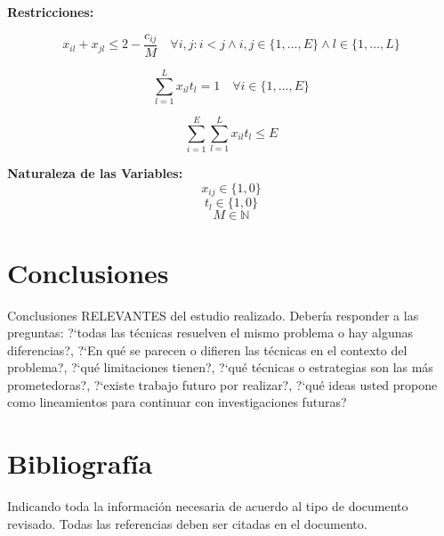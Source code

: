 \documentclass[letter, 10pt]{article}
\begin{document}
\textbf{Restricciones:}

\begin{equation} 
	x_{il} + x_{jl} \leq 2 - \frac{c_{ij}}{M} \quad \forall i, j : i<j \wedge i, j \in \{1, \ldots, E\} \wedge l \in \{1, \ldots, L\}
\end{equation}

\begin{equation}
	\sum_{l=1}^{L} x_{il}t_l = 1 \quad \forall i \in \{1, \ldots, E\}
\end{equation}

\begin{equation}
	\sum_{i=1}^{E} \sum_{l=1}^{L} x_{il}t_l \leq E
\end{equation}

\textbf{Naturaleza de las Variables:}
\begin{equation}
	x_{ij} \in \{1, 0\}
\end{equation}
\begin{equation}
	t_{l} \in \{1, 0\}
\end{equation}
\begin{equation}
	M \in \mathbb N
\end{equation}
\section{Conclusiones}

Conclusiones RELEVANTES del estudio realizado. Deber\'ia responder a las preguntas: ?`todas las t\'ecnicas resuelven el mismo problema o hay algunas diferencias?, ?`En qu\'e se parecen o difieren las t\'ecnicas en el contexto del problema?, ?`qu\'e limitaciones tienen?, ?`qu\'e t\'ecnicas o estrategias son las m\'as prometedoras?, ?`existe trabajo futuro por realizar?, ?`qu\'e ideas usted propone como lineamientos para continuar con investigaciones futuras?


\section{Bibliograf\'ia}
Indicando toda la informaci\'on necesaria de acuerdo al tipo de documento revisado. Todas las referencias deben ser citadas en el documento.


\end{document}
